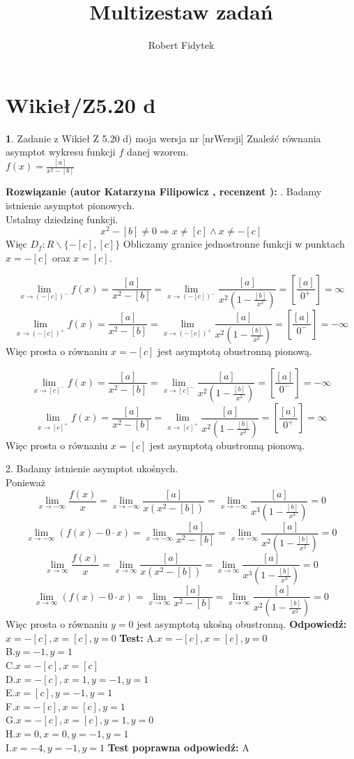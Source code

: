\documentclass[12pt, a4paper]{article}
\title{Multizestaw zadań}
\author{Robert Fidytek}
\date{}
\theoremstyle{definition} %
\newtheorem{zad}{}
\newcommand{\kategoria}[1]{\section{#1}} %
\newcommand{\zadStart}[1]{\begin{zad}#1\newline} %
\newcommand{\zadStop}{\end{zad}}   %
\newcommand{\rozwStart}[2]{\noindent \textbf{Rozwiązanie (autor #1 , recenzent #2): }\newline} %
\newcommand{\rozwStop}{\newline}                                            %
\newcommand{\odpStart}{\noindent \textbf{Odpowiedź:}\newline}    %
\newcommand{\odpStop}{\newline}                                             %
\newcommand{\testStart}{\noindent \textbf{Test:}\newline} %
\newcommand{\testStop}{\newline} %
\newcommand{\kluczStart}{\noindent \textbf{Test poprawna odpowiedź:}\newline} %
\newcommand{\kluczStop}{\newline} %
\begin{document}
\maketitle


\kategoria{Wikieł/Z5.20 d}
\zadStart{Zadanie z Wikieł Z 5.20 d) moja wersja nr [nrWersji]}
Znaleźć równania asymptot wykresu funkcji $f$ danej wzorem.\\
 $f(x)=\frac{[a]}{x^2-[b]}$
\zadStop
\rozwStart{Katarzyna Filipowicz}{}
1. Badamy istnienie asymptot pionowych.\\

Ustalmy dziedzinę funkcji.\\
$$
 x^2-[b]\neq 0\Rightarrow  x\neq[c] \wedge x\neq-[c]
$$
Więc $D_f:R\backslash \{-[c],[c]\}$
Obliczamy granice jednostronne funkcji w punktach $x=-[c]$ oraz $x=[c]$.



$$
\lim_{x\rightarrow (-[c])^{-}}f(x)=\frac{[a]}{x^2-[b]}=
\lim_{x\rightarrow (-[c])^{-}}\frac{[a]}{x^2(1-\frac{[b]}{x^2})}
=\left[\frac{[a]}{0^{+}}\right]=\infty
$$ $$
\lim_{x\rightarrow (-[c])^{+}}f(x)=\frac{[a]}{x^2-[b]}=
\lim_{x\rightarrow (-[c])^{+}}\frac{[a]}{x^2(1-\frac{[b]}{x^2})}
=\left[\frac{[a]}{0^{-}}\right]=-\infty
$$
Więc prosta o równaniu $x=-[c]$ jest asymptotą obustronną pionową.


$$
\lim_{x\rightarrow [c]^{-}}f(x)=\frac{[a]}{x^2-[b]}=
\lim_{x\rightarrow [c]^{-}}\frac{[a]}{x^2(1-\frac{[b]}{x^2})}
=\left[\frac{[a]}{0^{-}}\right]=-\infty
$$ $$
\lim_{x\rightarrow [c]^{+}}f(x)=\frac{[a]}{x^2-[b]}=
\lim_{x\rightarrow [c]^{+}}\frac{[a]}{x^2(1-\frac{[b]}{x^2})}
=\left[\frac{[a]}{0^{+}}\right]=\infty
$$
Więc prosta o równaniu $x=[c]$ jest asymptotą obustronną pionową.


2. Badamy istnienie asymptot ukośnych.\\
Ponieważ
$$ 
\lim_{x\rightarrow-\infty} \frac{f(x)}{x}
=\lim_{x\rightarrow-\infty}\frac{[a]}{x(x^2-[b])}
=\lim_{x\rightarrow-\infty}\frac{[a]}{x^3(1-\frac{[b]}{x^3})}=0
$$ $$
\lim_{x\rightarrow-\infty}(f(x)-0\cdot x)
=\lim_{x\rightarrow-\infty}\frac{[a]}{x^2-[b]}
=\lim_{x\rightarrow-\infty} \frac{[a]}{x^2(1-\frac{[b]}{x^2})}=0
$$
$$ 
\lim_{x\rightarrow\infty} \frac{f(x)}{x}
=\lim_{x\rightarrow\infty}\frac{[a]}{x(x^2-[b])}
=\lim_{x\rightarrow\infty}\frac{[a]}{x^3(1-\frac{[b]}{x^3})}=0
$$ $$
\lim_{x\rightarrow\infty}(f(x)-0\cdot x)
=\lim_{x\rightarrow\infty}\frac{[a]}{x^2-[b]}
=\lim_{x\rightarrow\infty} \frac{[a]}{x^2(1-\frac{[b]}{x^2})}=0
$$
Więc prosta o równaniu $y=0$ jest asymptotą ukośną obustronną.
\rozwStop
\odpStart
$x=-[c],x=[c],y=0$
\odpStop
\testStart
A.$x=-[c],x=[c],y=0$\\
B.$y=-1,y=1$\\
C.$x=-[c],x=[c]$\\
D.$x=-[c],x=1,y=-1,y=1$\\
E.$x=[c],y=-1,y=1$\\
F.$x=-[c],x=[c],y=1$\\
G.$x=-[c],x=[c],y=1,y=0$\\
H.$x=0,x=0,y=-1,y=1$\\
I.$x=-4,y=-1,y=1$
\testStop
\kluczStart
A
\kluczStop
\end{document}
